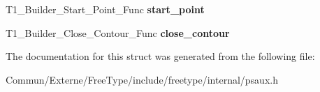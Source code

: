 \begin{DoxyCompactItemize}
\item 
T1\+\_\+\+Builder\+\_\+\+Start\+\_\+\+Point\+\_\+\+Func {\bfseries start\+\_\+point}\hypertarget{struct_t1___builder___funcs_rec___ab4897186c65875b4312d4ef68aad9d02}{}\label{struct_t1___builder___funcs_rec___ab4897186c65875b4312d4ef68aad9d02}

\item 
T1\+\_\+\+Builder\+\_\+\+Close\+\_\+\+Contour\+\_\+\+Func {\bfseries close\+\_\+contour}\hypertarget{struct_t1___builder___funcs_rec___abe163896432cc768719bf87cef0d1266}{}\label{struct_t1___builder___funcs_rec___abe163896432cc768719bf87cef0d1266}

\end{DoxyCompactItemize}


The documentation for this struct was generated from the following file\+:\begin{DoxyCompactItemize}
\item 
Commun/\+Externe/\+Free\+Type/include/freetype/internal/psaux.\+h\end{DoxyCompactItemize}
